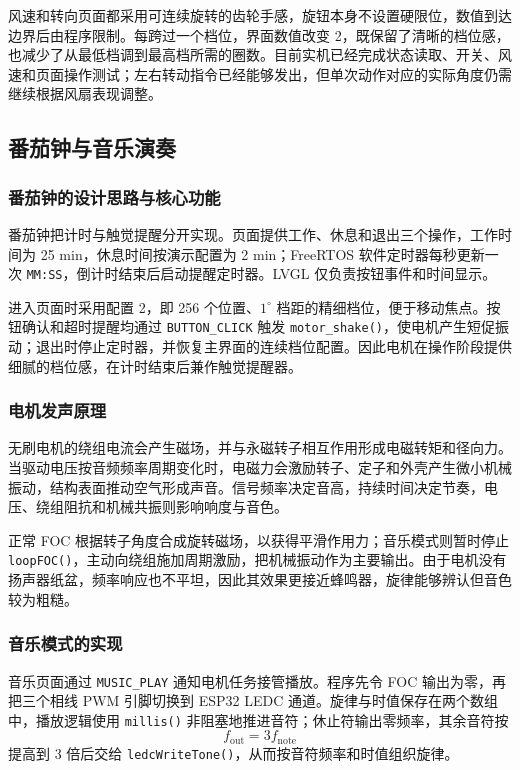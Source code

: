 风速和转向页面都采用可连续旋转的齿轮手感，旋钮本身不设置硬限位，数值到达边界后由程序限制。每跨过一个档位，界面数值改变 2，既保留了清晰的档位感，也减少了从最低档调到最高档所需的圈数。目前实机已经完成状态读取、开关、风速和页面操作测试；左右转动指令已经能够发出，但单次动作对应的实际角度仍需继续根据风扇表现调整。

\subsection{番茄钟与音乐演奏}

\subsubsection{番茄钟的设计思路与核心功能}

番茄钟把计时与触觉提醒分开实现。页面提供工作、休息和退出三个操作，工作时间为 25 min，休息时间按演示配置为 2 min；FreeRTOS 软件定时器每秒更新一次 \texttt{MM:SS}，倒计时结束后启动提醒定时器。LVGL 仅负责按钮事件和时间显示。

进入页面时采用配置 2，即 256 个位置、$1^\circ$ 档距的精细档位，便于移动焦点。按钮确认和超时提醒均通过 \texttt{BUTTON\_CLICK} 触发 \texttt{motor\_shake()}，使电机产生短促振动；退出时停止定时器，并恢复主界面的连续档位配置。因此电机在操作阶段提供细腻的档位感，在计时结束后兼作触觉提醒器。

\subsubsection{电机发声原理}

无刷电机的绕组电流会产生磁场，并与永磁转子相互作用形成电磁转矩和径向力。当驱动电压按音频频率周期变化时，电磁力会激励转子、定子和外壳产生微小机械振动，结构表面推动空气形成声音。信号频率决定音高，持续时间决定节奏，电压、绕组阻抗和机械共振则影响响度与音色。

正常 FOC 根据转子角度合成旋转磁场，以获得平滑作用力；音乐模式则暂时停止 \texttt{loopFOC()}，主动向绕组施加周期激励，把机械振动作为主要输出。由于电机没有扬声器纸盆，频率响应也不平坦，因此其效果更接近蜂鸣器，旋律能够辨认但音色较为粗糙。

\subsubsection{音乐模式的实现}

音乐页面通过 \texttt{MUSIC\_PLAY} 通知电机任务接管播放。程序先令 FOC 输出为零，再把三个相线 PWM 引脚切换到 ESP32 LEDC 通道。旋律与时值保存在两个数组中，播放逻辑使用 \texttt{millis()} 非阻塞地推进音符；休止符输出零频率，其余音符按
\begin{equation}
f_{\mathrm{out}}=3f_{\mathrm{note}}
\end{equation}
提高到 3 倍后交给 \texttt{ledcWriteTone()}，从而按音符频率和时值组织旋律。

